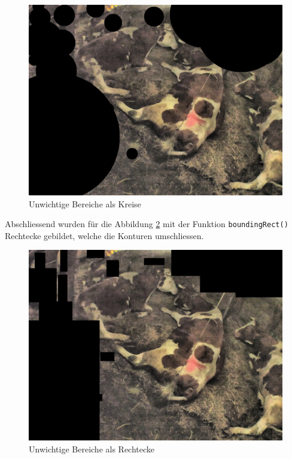 \begin{figure}[H]
	\center
	\includegraphics[scale=0.43]{Grafiken/entwicklung/7unwichtigeKreise.jpg}
	\caption{Unwichtige Bereiche als Kreise } 
	\label{fig: Unwichtige Bereiche als Kreise}
\end{figure}
Abschliessend wurden für die Abbildung \ref{fig: Unwichtige Bereiche als Rechtecke} mit der Funktion \texttt{boundingRect()} Rechtecke gebildet, welche die Konturen umschliessen.
\begin{figure}[H]
	\center
	\includegraphics[scale=0.43]{Grafiken/entwicklung/7unwichtigeRechtecke.jpg}
	\caption{Unwichtige Bereiche als Rechtecke} 
	\label{fig: Unwichtige Bereiche als Rechtecke}
\end{figure}


